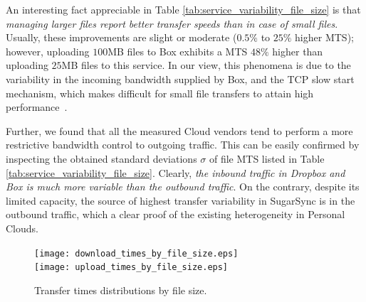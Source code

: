An interesting fact appreciable in Table \ref{tab:service_variability_file_size}
is that \textit{managing larger files report better transfer 
speeds than in case of small files}. Usually, these 
improvements are slight or moderate ($0.5\%$ to $25\%$ higher MTS); 
however, uploading $100$MB files to Box exhibits a MTS $48\%$ higher
than uploading $25$MB files to this service. In our view, this phenomena is due
to the variability in the incoming bandwidth supplied by Box, and 
the TCP slow start mechanism, which makes difficult for small file transfers 
to attain high performance~\cite{allman1999tcp}. 

Further, we found that all the measured Cloud vendors tend to perform a more restrictive
bandwidth control to outgoing traffic. This can be easily confirmed
by inspecting the obtained standard deviations $\sigma$ of file MTS 
listed in Table \ref{tab:service_variability_file_size}. Clearly,
\textit{the inbound traffic in Dropbox and Box is much more variable than the outbound traffic}. 
On the contrary, despite its limited capacity, the source of highest
transfer variability in SugarSync is in the outbound traffic, which a clear
proof of the existing heterogeneity in Personal Clouds.


\begin{figure}
\centering	
{\label{fig:down_transfer_times_by_size}
\texttt{[image: download\_times\_by\_file\_size.eps]}} \\

{\label{fig:up_transfer_times_by_size}
\texttt{[image: upload\_times\_by\_file\_size.eps]}}
	\caption{Transfer times distributions by file size.}
	\label{fig:transfer_times_and_speed_by_size}
	\vspace{-4mm}
\end{figure}


